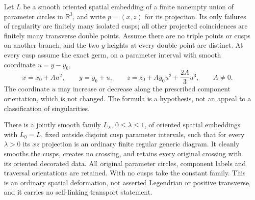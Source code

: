 \begin{lemma}
\label{ce:rounding}
Let $L$ be a smooth oriented spatial embedding of a finite nonempty union
of parameter circles in $\mathbb R^3$, and write $p=(x,z)$ for its
projection. Its only failures of regularity are finitely many isolated
cusps; all other projected coincidences are finitely many transverse
double points. Assume there are no triple points or cusps on another
branch, and the two $y$ heights at every double point are distinct.
At every cusp assume the exact germ, on a parameter interval with smooth
coordinate $u=y-y_0$,
\begin{equation}\label{ce:exact-germ}
 x=x_0+Au^2,\qquad y=y_0+u,\qquad
 z=z_0+Ay_0u^2+\frac{2A}{3}u^3,\qquad A\ne0.
\end{equation}
The coordinate $u$ may increase or decrease along the prescribed component
orientation, which is not changed. The formula is a hypothesis, not an
appeal to a classification of singularities.

There is a jointly smooth family $L_\lambda$, $0\leq\lambda\leq1$, of
oriented spatial embeddings with $L_0=L$, fixed outside disjoint cusp
parameter intervals, such that for every $\lambda>0$ its $xz$ projection
is an ordinary finite regular generic diagram. It cleanly smooths the
cusps, creates no crossing, and retains every original crossing with
its oriented decorated data. All original parameter circles, component
labels and traversal orientations are retained. With no cusps take the
constant family.
This is an ordinary spatial deformation, not asserted Legendrian or
positive transverse, and it carries no self-linking transport statement.
\end{lemma}
